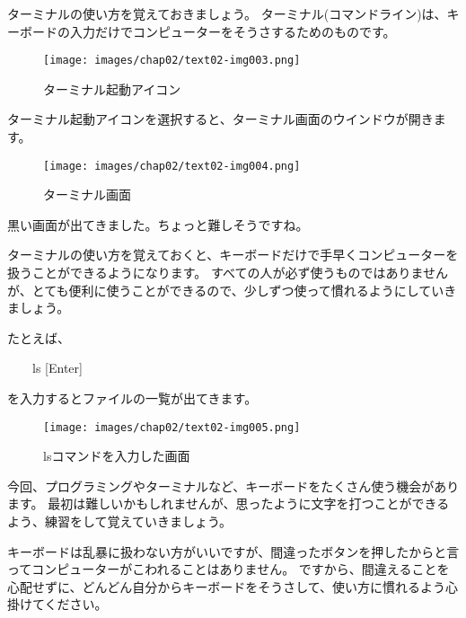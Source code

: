 ターミナルの使い方を覚えておきましょう。
ターミナル(コマンドライン)は、キーボードの入力だけでコンピューターをそうさするためのものです。

\begin{figure}[H]
  \begin{center}
    \texttt{[image: images/chap02/text02-img003.png]}
    \caption{ターミナル起動アイコン}
  \end{center}
  \label{fig:terminal_icon}
\end{figure}

ターミナル起動アイコンを選択すると、ターミナル画面のウインドウが開きます。

\begin{figure}[H]
  \begin{center}
    \texttt{[image: images/chap02/text02-img004.png]}
    \caption{ターミナル画面}
  \end{center}
  \label{fig:terminal_display}
\end{figure}

\noindent
黒い画面が出てきました。ちょっと難しそうですね。

ターミナルの使い方を覚えておくと、キーボードだけで手早くコンピューターを扱うことができるようになります。
すべての人が必ず使うものではありませんが、とても便利に使うことができるので、少しずつ使って慣れるようにしていきましょう。

\noindent
たとえば、

\vspace{1em}
\ \ \ \ ls [Enter]
\vspace{1em}
  
\noindent
を入力するとファイルの一覧が出てきます。

\begin{figure}[H]
  \begin{center}
    \texttt{[image: images/chap02/text02-img005.png]}
    \caption{lsコマンドを入力した画面}
  \end{center}
  \label{fig:terminal_ls}
\end{figure}

今回、プログラミングやターミナルなど、キーボードをたくさん使う機会があります。
最初は難しいかもしれませんが、思ったように文字を打つことができるよう、練習をして覚えていきましょう。

キーボードは乱暴に扱わない方がいいですが、間違ったボタンを押したからと言ってコンピューターがこわれることはありません。
ですから、間違えることを心配せずに、どんどん自分からキーボードをそうさして、使い方に慣れるよう心掛けてください。

